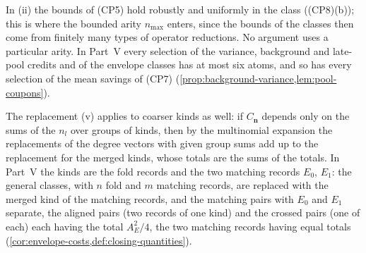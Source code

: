 In (ii) the bounds of (CP5) hold robustly and uniformly in the class
((CP8)(b)); this is where the bounded arity $n_{\max}$ enters, since the
bounds of the classes then come from finitely many types of operator
reductions. No argument uses a particular arity. In Part~V every selection of
the variance, background and late-pool credits and of the envelope classes
has at most six atoms, and so has every selection of the mean savings of
(CP7) (\cref{prop:background-variance,lem:pool-coupons}).

The replacement (v) applies to coarser kinds as well: if $C_{\boldsymbol n}$
depends only on the sums of the $n_l$ over groups of kinds, then by the
multinomial expansion the replacements of the degree vectors with given group
sums add up to the replacement for the merged kinds, whose totals are the
sums of the totals. In Part~V the kinds are the fold records and the two
matching records $E_0$, $E_1$: the general classes, with $n$ fold and $m$
matching records, are replaced with the merged kind of the matching records,
and the matching pairs with $E_0$ and $E_1$ separate, the aligned pairs (two
records of one kind) and the crossed pairs (one of each) each having the
total $A_E^2/4$, the two matching records having equal totals
(\cref{cor:envelope-costs,def:closing-quantities}).

